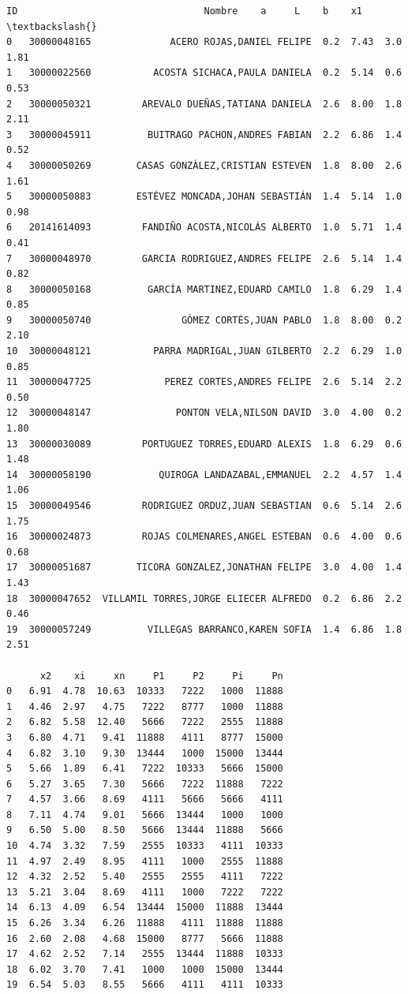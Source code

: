 \documentclass[11pt]{article}
\makeatletter
\newcommand{\boxspacing}{\kern\kvtcb@left@rule\kern\kvtcb@boxsep}
\newcommand{\prompt}[4]{
        {\ttfamily\llap{{\color{#2}[#3]:\hspace{3pt}#4}}\vspace{-\baselineskip}}
    }
\makeatother
\begin{document}
            \begin{tcolorbox}[breakable, size=fbox, boxrule=.5pt, pad at break*=1mm, opacityfill=0]
\prompt{Out}{outcolor}{13}{\boxspacing}
\begin{Verbatim}[commandchars=\\\{\}]
             ID                                 Nombre    a     L    b    x1  \textbackslash{}
0   30000048165              ACERO ROJAS,DANIEL FELIPE  0.2  7.43  3.0  1.81
1   30000022560           ACOSTA SICHACA,PAULA DANIELA  0.2  5.14  0.6  0.53
2   30000050321         AREVALO DUEÑAS,TATIANA DANIELA  2.6  8.00  1.8  2.11
3   30000045911          BUITRAGO PACHON,ANDRES FABIAN  2.2  6.86  1.4  0.52
4   30000050269        CASAS GONZÁLEZ,CRISTIAN ESTEVEN  1.8  8.00  2.6  1.61
5   30000050883        ESTÉVEZ MONCADA,JOHAN SEBASTIÁN  1.4  5.14  1.0  0.98
6   20141614093         FANDIÑO ACOSTA,NICOLÁS ALBERTO  1.0  5.71  1.4  0.41
7   30000048970         GARCIA RODRIGUEZ,ANDRES FELIPE  2.6  5.14  1.4  0.82
8   30000050168          GARCÍA MARTINEZ,EDUARD CAMILO  1.8  6.29  1.4  0.85
9   30000050740                GÓMEZ CORTÉS,JUAN PABLO  1.8  8.00  0.2  2.10
10  30000048121           PARRA MADRIGAL,JUAN GILBERTO  2.2  6.29  1.0  0.85
11  30000047725             PEREZ CORTES,ANDRES FELIPE  2.6  5.14  2.2  0.50
12  30000048147               PONTON VELA,NILSON DAVID  3.0  4.00  0.2  1.80
13  30000030089         PORTUGUEZ TORRES,EDUARD ALEXIS  1.8  6.29  0.6  1.48
14  30000058190            QUIROGA LANDAZABAL,EMMANUEL  2.2  4.57  1.4  1.06
15  30000049546         RODRIGUEZ ORDUZ,JUAN SEBASTIAN  0.6  5.14  2.6  1.75
16  30000024873         ROJAS COLMENARES,ANGEL ESTEBAN  0.6  4.00  0.6  0.68
17  30000051687        TICORA GONZALEZ,JONATHAN FELIPE  3.0  4.00  1.4  1.43
18  30000047652  VILLAMIL TORRES,JORGE ELIECER ALFREDO  0.2  6.86  2.2  0.46
19  30000057249          VILLEGAS BARRANCO,KAREN SOFIA  1.4  6.86  1.8  2.51

      x2    xi     xn     P1     P2     Pi     Pn
0   6.91  4.78  10.63  10333   7222   1000  11888
1   4.46  2.97   4.75   7222   8777   1000  11888
2   6.82  5.58  12.40   5666   7222   2555  11888
3   6.80  4.71   9.41  11888   4111   8777  15000
4   6.82  3.10   9.30  13444   1000  15000  13444
5   5.66  1.89   6.41   7222  10333   5666  15000
6   5.27  3.65   7.30   5666   7222  11888   7222
7   4.57  3.66   8.69   4111   5666   5666   4111
8   7.11  4.74   9.01   5666  13444   1000   1000
9   6.50  5.00   8.50   5666  13444  11888   5666
10  4.74  3.32   7.59   2555  10333   4111  10333
11  4.97  2.49   8.95   4111   1000   2555  11888
12  4.32  2.52   5.40   2555   2555   4111   7222
13  5.21  3.04   8.69   4111   1000   7222   7222
14  6.13  4.09   6.54  13444  15000  11888  13444
15  6.26  3.34   6.26  11888   4111  11888  11888
16  2.60  2.08   4.68  15000   8777   5666  11888
17  4.62  2.52   7.14   2555  13444  11888  10333
18  6.02  3.70   7.41   1000   1000  15000  13444
19  6.54  5.03   8.55   5666   4111   4111  10333
\end{Verbatim}
\end{tcolorbox}
        
\end{document}
